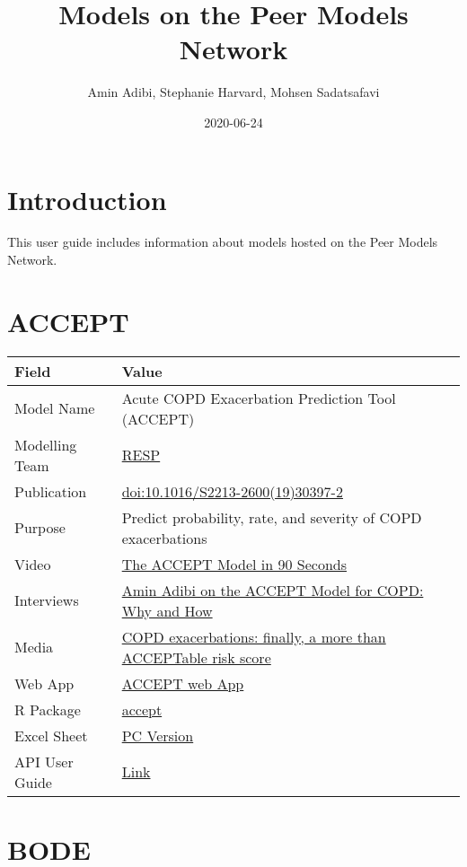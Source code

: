 \documentclass[
]{book}
\title{Models on the Peer Models Network}
\author{Amin Adibi, Stephanie Harvard, Mohsen Sadatsafavi}
\date{2020-06-24}
\begin{document}
\maketitle

{
\setcounter{tocdepth}{1}
\tableofcontents
}
\hypertarget{introduction}{%
\chapter{Introduction}\label{introduction}}

This user guide includes information about models hosted on the Peer Models Network.

\hypertarget{accept}{%
\chapter{ACCEPT}\label{accept}}

\begin{longtable}[]{@{}ll@{}}
\toprule
Field & Value\tabularnewline
\midrule
\endhead
Model Name & Acute COPD Exacerbation Prediction Tool (ACCEPT)\tabularnewline
Modelling Team & \href{http://resp.core.ubc.ca}{RESP}\tabularnewline
Publication & \href{https://doi.org/10.1016/S2213-2600(19)30397-2}{doi:10.1016/S2213-2600(19)30397-2}\tabularnewline
Purpose & Predict probability, rate, and severity of COPD exacerbations\tabularnewline
Video & \href{https://www.peermodelsnetwork.com/educational-videos?wix-vod-video-id=679cbb410686401193779a2931731c56\&wix-vod-comp-id=comp-k8q9lys1}{The ACCEPT Model in 90 Seconds}\tabularnewline
Interviews & \href{https://www.peermodelsnetwork.com/post/amin-adibi-on-the-accept-model-for-copd-why-and-how}{Amin Adibi on the ACCEPT Model for COPD: Why and How}\tabularnewline
Media & \href{https://doi.org/10.1016/S2213-2600(20)30049-7}{COPD exacerbations: finally, a more than ACCEPTable risk score}\tabularnewline
Web App & \href{http://resp.core.ubc.ca/ipress/accept}{ACCEPT web App}\tabularnewline
R Package & \href{https://cran.r-project.org/package=accept}{accept}\tabularnewline
Excel Sheet & \href{https://drive.google.com/uc?export=download\&id=1NNE7pKBVP939tly-6JISaVw-y33m8y28}{PC Version}\tabularnewline
API User Guide & \href{https://resplab.github.io/prismguide/api-users-guide.html\#accept-1}{Link}\tabularnewline
\bottomrule
\end{longtable}

\hypertarget{bode}{%
\chapter{BODE}\label{bode}}
\end{document}
